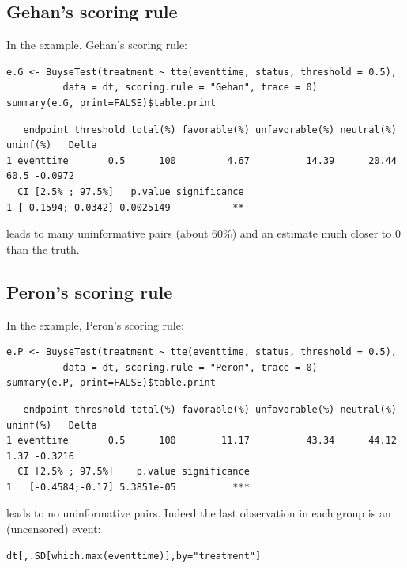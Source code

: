 \documentclass[12pt]{article}
\begin{document}
\subsection{Gehan's scoring rule}
\label{sec:orgb8c50c8}
In the example, Gehan's scoring rule:
\lstset{language=r,label= ,caption= ,captionpos=b,numbers=none}
\begin{lstlisting}
e.G <- BuyseTest(treatment ~ tte(eventtime, status, threshold = 0.5),
          data = dt, scoring.rule = "Gehan", trace = 0)
summary(e.G, print=FALSE)$table.print
\end{lstlisting}

\begin{verbatim}
   endpoint threshold total(%) favorable(%) unfavorable(%) neutral(%) uninf(%)   Delta
1 eventtime       0.5      100         4.67          14.39      20.44     60.5 -0.0972
  CI [2.5% ; 97.5%]   p.value significance
1 [-0.1594;-0.0342] 0.0025149           **
\end{verbatim}


leads to many uninformative pairs (about 60\%) and an estimate much
closer to 0 than the truth.

\subsection{Peron's scoring rule}
\label{sec:orgcbbe255}
In the example, Peron's scoring rule:
\lstset{language=r,label= ,caption= ,captionpos=b,numbers=none}
\begin{lstlisting}
e.P <- BuyseTest(treatment ~ tte(eventtime, status, threshold = 0.5),
          data = dt, scoring.rule = "Peron", trace = 0)
summary(e.P, print=FALSE)$table.print
\end{lstlisting}

\begin{verbatim}
   endpoint threshold total(%) favorable(%) unfavorable(%) neutral(%) uninf(%)   Delta
1 eventtime       0.5      100        11.17          43.34      44.12     1.37 -0.3216
  CI [2.5% ; 97.5%]    p.value significance
1   [-0.4584;-0.17] 5.3851e-05          ***
\end{verbatim}

leads to no uninformative pairs. Indeed the last observation in each group is an (uncensored) event:
\lstset{language=r,label= ,caption= ,captionpos=b,numbers=none}
\begin{lstlisting}
dt[,.SD[which.max(eventtime)],by="treatment"]
\end{lstlisting}
\end{document}
